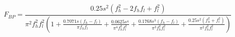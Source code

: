 \begin{equation}
F_{BP} = \frac{0.25 s^{2} \left(f_{h}^{2} - 2 f_{h} f_{l} + f_{l}^{2}\right)}{\pi^{2} f_{h}^{2} f_{l}^{2} \left(1 + \frac{0.7071 s \left(f_{h} - f_{l}\right)}{\pi f_{h} f_{l}} + \frac{0.0625 s^{4}}{\pi^{4} f_{h}^{2} f_{l}^{2}} + \frac{0.1768 s^{3} \left(f_{h} - f_{l}\right)}{\pi^{3} f_{h}^{2} f_{l}^{2}} + \frac{0.25 s^{2} \left(f_{h}^{2} + f_{l}^{2}\right)}{\pi^{2} f_{h}^{2} f_{l}^{2}}\right)}
\end{equation}

